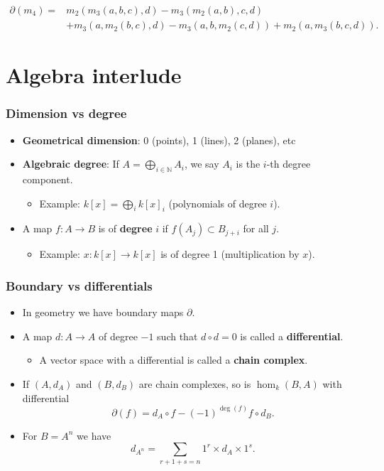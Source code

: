 \documentclass{beamer}
\theoremstyle{definition}
\begin{document}
\begin{frame}
 \begin{align*}
\partial(m_4)=&m_2(m_3(a,b,c), d)-m_3(m_2(a,b), c, d)\\
&+m_3(a, m_2(b,c), d)-m_3(a, b, m_2(c,d))+m_2(a, m_3(b,c,d)).
\end{align*}
\end{frame}
\section{Algebra interlude}
\begin{frame}
\frametitle{Dimension vs degree}

\begin{itemize}
\item<1-> \textbf{Geometrical dimension}: 0 (points), 1 (lines), 2 (planes), etc
\item<2-> \textbf{Algebraic degree}: If $A=\bigoplus_{i\in\mathbb{N}} A_i$, we say $A_i$ is the $i$-th degree component.
\begin{itemize}
\item<3-> Example: $k[x]=\bigoplus_i k[x]_i$ (polynomials of degree $i$).
\end{itemize}
\item<4-> A map $f:A\to B$ is of \textbf{degree} $i$ if $f(A_j)\subset B_{j+i}$ for all $j$.
\begin{itemize}
\item<5-> Example: $x:k[x]\to k[x]$ is of degree 1 (multiplication by $x$).
\end{itemize}

\end{itemize}
\end{frame}
\begin{frame}
\frametitle{Boundary vs differentials}
\begin{itemize}
\item In geometry we have boundary maps $\partial$.

\item<2-> A map $d:A\to A$ of degree $-1$ such that $d\circ d=0$ is called a \textbf{differential}. %
\begin{itemize}
\item<3-> A vector space with a differential is called a \textbf{chain complex}.
\end{itemize}
\item<4-> If $(A,d_A)$ and $(B,d_B)$ are chain complexes, so is $\hom_k(B,A)$ with differential
\[\partial(f)=d_A\circ f - (-1)^{\deg(f)}f\circ d_B.\] 
\item<5-> For $B=A^n$ we have 
\[d_{A^n}= \sum_{r+1+s=n} 1^r\times d_A\times 1^s.\]
\end{itemize}
\end{frame}
\end{document}
